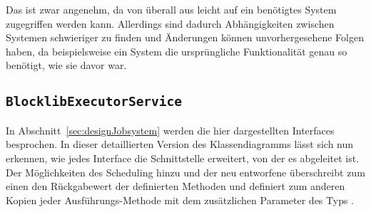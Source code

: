 Das ist zwar angenehm, da von überall aus leicht auf ein benötigtes System zugegriffen werden kann. Allerdings sind dadurch Abhängigkeiten zwischen Systemen schwieriger zu finden und Änderungen können unvorhergesehene Folgen haben, da beispielsweise ein System die ursprüngliche Funktionalität genau so benötigt, wie sie davor war. 

\clearpage
\subsection{\texttt{BlocklibExecutorService}}\label{appendix:BlocklibExecutorService}
{
	\centering
	
	\par
}
In Abschnitt~\vref{sec:designJobsystem} werden die hier dargestellten Interfaces besprochen. In dieser detaillierten Version des Klassendiagramms lässt sich nun erkennen, wie jedes Interface die Schnittstelle erweitert, von der es abgeleitet ist. Der \classScheduledExecutorService{} Möglichkeiten des Scheduling hinzu und der neu entworfene \classBlocklibExecutorService{} überschreibt zum einen den Rückgabewert der definierten Methoden und definiert zum anderen Kopien jeder Ausführungs-Methode mit dem zusätzlichen Parameter  des Typs \classTaskPriority{}.

\clearpage
